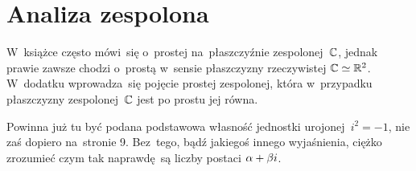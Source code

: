 \documentclass[a4paper,11pt]{article}
\begin{document}
\newpage
\section{Analiza zespolona}

\vspace{\spaceTwo}








\start W~książce często mówi~się o~prostej na~płaszczyźnie
zespolonej~$\mathbb{C}$, jednak prawie zawsze chodzi o~prostą w~sensie
płaszczyzny rzeczywistej $\mathbb{C} \simeq \mathbb{R}^{ 2 }$. W~dodatku wprowadza~się
pojęcie prostej zespolonej, która w~przypadku płaszczyzny
zespolonej~$\mathbb{C}$ jest po prostu jej równa.

\vspace{\spaceFour}


\start {} Powinna już tu być podana podstawowa własność jednostki
urojonej~$i^{ 2 } = -1$, nie zaś dopiero na~stronie 9. Bez~tego, bądź
jakiegoś innego wyjaśnienia, ciężko zrozumieć czym tak naprawdę~są
liczby postaci $\alpha + \beta i$.

\vspace{\spaceFour}
\end{document}
